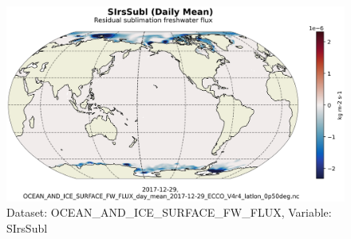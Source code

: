 \begin{figure}[H]
\centering
\includegraphics[scale=0.55]{../images/plots/latlon_plots/Ocean_and_Sea-Ice_Surface_Freshwater_Fluxes/SIrsSubl.png}
\caption{Dataset: OCEAN\_AND\_ICE\_SURFACE\_FW\_FLUX, Variable: SIrsSubl}
\label{tab:table-OCEAN_AND_ICE_SURFACE_FW_FLUX_SIrsSubl-Plot}
\end{figure}
\pagebreak
